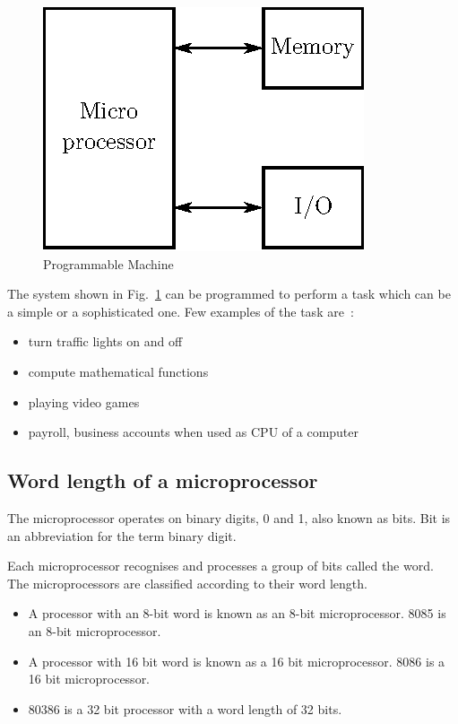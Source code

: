 \begin{figure}[H]
\centering
\includegraphics{chap7/fig7.1.eps}
\bigskip
\caption{Programmable Machine}\label{fig7.1}
\end{figure}

The system shown in Fig.~\ref{fig7.1} can be programmed to perform a task which can be a simple or a sophisticated one. Few examples of the task are~:
\begin{itemize}
\item turn traffic lights on and off

\item compute mathematical functions

\item playing video games

\item payroll, business accounts when used as CPU of a computer
\end{itemize}

\subsection{Word length of a microprocessor}\label{sec7.1.1}

The microprocessor operates on binary digits, 0 and 1, also known as bits. Bit is an abbreviation for the term binary digit.

Each microprocessor recognises and processes a group of bits called the word. The microprocessors are classified according to their word length.
\begin{itemize}
\item A processor with an $8$-bit word is known as an $8$-bit microprocessor. 8085 is an $8$-bit microprocessor.

\item A processor with 16 bit word is known as a 16 bit microprocessor. 8086 is a 16 bit microprocessor.

\item 80386 is a 32 bit processor with a word length of 32 bits.
\end{itemize}

